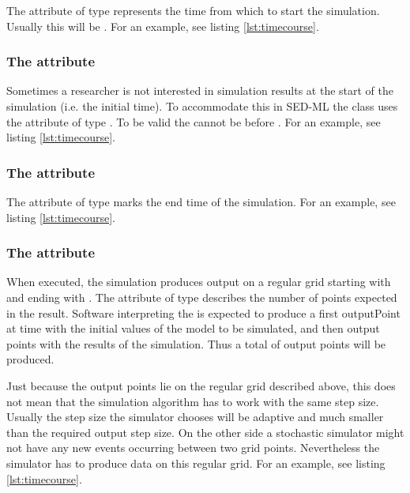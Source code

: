 The attribute  of type  represents the time from which to start the simulation. Usually this will be . For an example, see listing \ref{lst:timecourse}. 

\subsubsection{The  attribute}

\label{sec:outputStartTime}

Sometimes a researcher is not interested in simulation results at the start of the simulation (i.e. the initial time). To accommodate this in SED-ML the  class uses the  attribute  of type . To be valid the  cannot be before .  For an example, see listing \ref{lst:timecourse}. 

\subsubsection{The  attribute}
\label{sec:outputEndTime}

The attribute  of type  marks the end time of the simulation. For an example, see listing \ref{lst:timecourse}. 

\subsubsection{The  attribute}
\label{sec:numberOfPoints}

When executed, the  simulation produces output on a regular grid starting with  and ending with . The attribute   of type  describes the number of points expected in the result. Software interpreting the  is expected to produce a first outputPoint at time  with the initial values of the model to be simulated, and then  output points with the results of the simulation. Thus a total of  output points will be produced.

Just because the output points lie on the regular grid described above, this does not mean that the simulation algorithm has to work with the same step size. Usually the step size the simulator chooses will be adaptive and much smaller than the required output step size. On the other side a stochastic simulator might not have any new events occurring between two grid points. Nevertheless the simulator has to produce data on this regular grid. For an example, see listing \ref{lst:timecourse}. 


